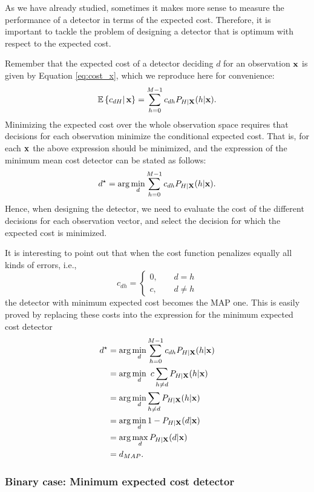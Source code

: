 As we have already studied, sometimes it makes more sense to measure the performance of a detector in terms of the expected cost. Therefore, it is important to tackle the problem of designing a detector that is optimum with respect to the expected cost.

Remember that the expected cost of a detector deciding $d$ for an observation ${\bf x}$ is given by Equation \eqref{eq:cost_x}, which we reproduce here for convenience:
\begin{equation}
    \mathbb{E}\left\{ c_{dH}\right|{\bf x}\} = \sum_{h=0}^{M-1} c_{dh} P_{H|\bf X}(h|{\bf x}) \label{eq:mean_x_2}.
\end{equation}
Minimizing the expected cost over the whole observation space requires that decisions for each observation minimize the conditional expected cost. That is, for each ${\bf x}$ the above expression should be minimized, and the expression of the minimum mean cost detector can be stated as follows:
$$d^\star = \arg\min_{d} \sum_{h=0}^{M-1} c_{dh} P_{H|\bf X}(h|{\bf x}).$$
Hence, when designing the detector, we need to evaluate the cost of the different decisions for each observation vector, and select the decision for which the expected cost is minimized.

It is interesting to point out that when the cost function penalizes equally all kinds of errors, i.e.,
$$c_{dh} = \left\{\begin{array}{ll} 0, & \;\;\;\;d=h \\ c, & \;\;\;\;d\neq h\end{array}\right.$$
the detector with minimum expected cost becomes the MAP one. This is easily proved by replacing these costs into the expression for the minimum expected cost detector
\begin{align}
    d^\star & = \arg\min_{d} \sum_{h=0}^{M-1} c_{dh} P_{H|\bf X}(h|{\bf x}) \nonumber \\
            & = \arg\min_{d} \ c \sum_{h\neq d} P_{H|\bf X}(h|{\bf x}) \nonumber \\
            & = \arg\min_{d} \sum_{h\neq d} P_{H|\bf X}(h|{\bf x}) \nonumber \\
            & = \arg\min_{d} 1 - P_{H|\bf X}(d|{\bf x}) \nonumber \\
            & = \arg\max_{d} P_{H|\bf X}(d|{\bf x}) \nonumber \\
            & = d_{MAP}.
\end{align}

\subsubsection{Binary case: Minimum expected cost detector}

